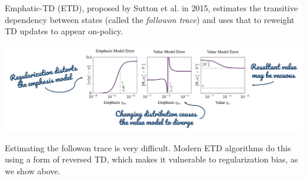 Emphatic-TD (ETD), proposed by Sutton et al. in 2015, estimates the transitive dependency between states (called the \emph{followon trace}) and uses that to reweight TD updates to appear on-policy.
\vspace{-.11in}
\begin{center}
    \includegraphics[scale=0.4]{parts/emphatic/emphatic.png}
\end{center}
\vspace{-.11in}
Estimating the followon trace is very difficult. Modern ETD algorithms do this using a form of reversed TD, which makes it vulnerable to regularization bias, as we show above.
\vspace{-.2in}
